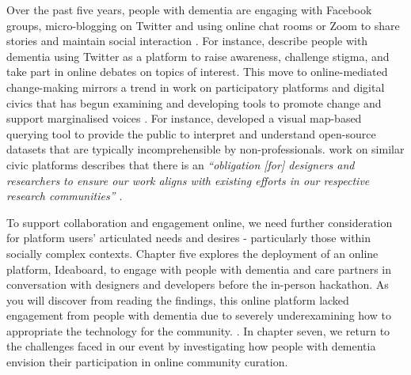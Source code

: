 Over the past five years, people with dementia are engaging with Facebook groups, micro-blogging on Twitter and using online chat rooms or Zoom to share stories and maintain social interaction \citep{lazar_safe_2019}. For instance, \cite{talbot_how_2020} describe people with dementia using Twitter as a platform to raise awareness, challenge stigma, and take part in online debates on topics of interest. This move to online-mediated change-making mirrors a trend in work on participatory platforms and digital civics that has begun examining and developing tools to promote change and support marginalised voices \citep{corbett_exploring_2018}. For instance, \cite{puussaar_making_2018} developed a visual map-based querying tool to provide the public to interpret and understand open-source datasets that are typically incomprehensible by non-professionals. \cite{asad_tap_2017} work on similar civic platforms describes that there is an \textit{``obligation [for] designers and researchers to ensure our work aligns with existing efforts in our respective research communities'' \citep[pg. 6314]{asad_tap_2017}}.

To support collaboration and engagement online, we need further consideration for platform users’ articulated needs and desires - particularly those within socially complex contexts. Chapter five explores the deployment of an online platform, Ideaboard, to engage with people with dementia and care partners in conversation with designers and developers before the in-person hackathon. As you will discover from reading the findings, this online platform lacked engagement from people with dementia due to severely underexamining how to appropriate the technology for the community. \citep{lindqvist2018contrasting}. In chapter seven, we return to the challenges faced in our event by investigating how people with dementia envision their participation in online community curation.

